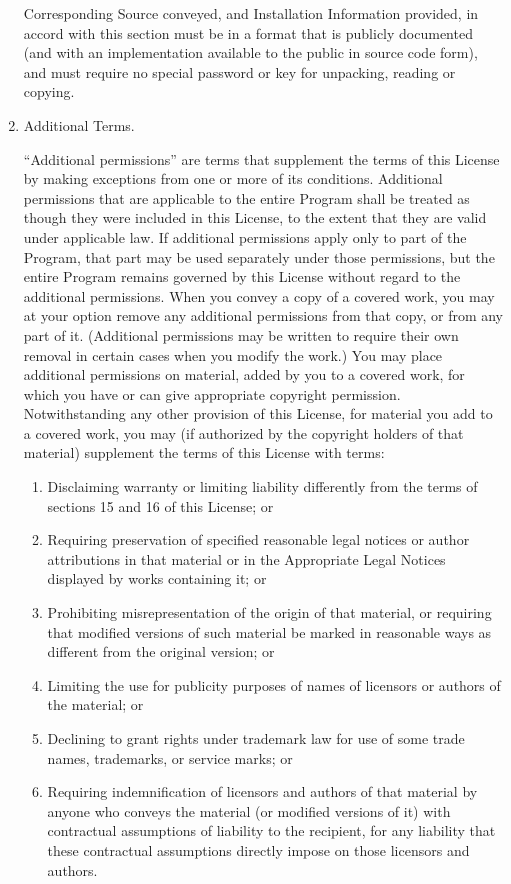 \documentclass{article}
\begin{document}
\begin{enumerate}[\hspace{-18pt}1.]
Corresponding Source conveyed, and Installation Information provided, in accord with this section must be in a format that is publicly documented (and with an implementation available to the public in source code form), and must require no special password or key for unpacking, reading or copying.

\item Additional Terms.

``Additional permissions'' are terms that supplement the terms of this License by making exceptions from one or more of its conditions. Additional permissions that are applicable to the entire Program shall be treated as though they were included in this License, to the extent that they are valid under applicable law.  If additional permissions apply only to part of the Program, that part may be used separately under those permissions, but the entire Program remains governed by this License without regard to the additional permissions.
When you convey a copy of a covered work, you may at your option remove any additional permissions from that copy, or from any part of it.  (Additional permissions may be written to require their own removal in certain cases when you modify the work.)  You may place additional permissions on material, added by you to a covered work, for which you have or can give appropriate copyright permission.
Notwithstanding any other provision of this License, for material you add to a covered work, you may (if authorized by the copyright holders of that material) supplement the terms of this License with terms:   
\begin{enumerate}   
\item Disclaiming warranty or limiting liability differently from the   terms of sections 15 and 16 of this License; or
\item Requiring preservation of specified reasonable legal notices or   author attributions in that material or in the Appropriate Legal   Notices displayed by works containing it; or
\item Prohibiting misrepresentation of the origin of that material, or   requiring that modified versions of such material be marked in   reasonable ways as different from the original version; or
\item Limiting the use for publicity purposes of names of licensors or   authors of the material; or
\item Declining to grant rights under trademark law for use of some   trade names, trademarks, or service marks; or 
\item Requiring indemnification of licensors and authors of that   material by anyone who conveys the material (or modified versions of   it) with contractual assumptions of liability to the recipient, for   any liability that these contractual assumptions directly impose on   those licensors and authors.   

\end{enumerate}
\end{enumerate}
\end{document}
